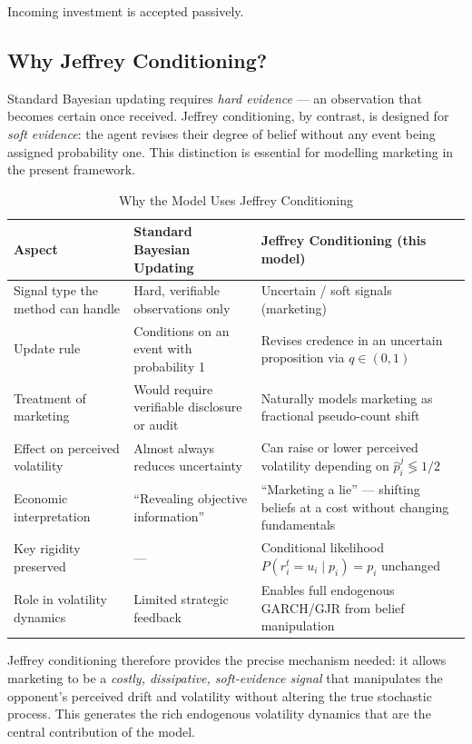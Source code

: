 \documentclass[12pt,a4paper]{article}
\newcommand{\1}{\mathbf{1}}
\begin{document}
Incoming investment is accepted passively.

\subsection{Why Jeffrey Conditioning?}

Standard Bayesian updating requires \emph{hard evidence} — an observation that becomes certain once received. Jeffrey conditioning, by contrast, is designed for \emph{soft evidence}: the agent revises their degree of belief without any event being assigned probability one. This distinction is essential for modelling marketing in the present framework.


\begin{table}[H]
\centering
\caption{Why the Model Uses Jeffrey Conditioning}
\label{tab:jeffrey_motivation}
\begin{tabular}{@{} l l l @{}}
\toprule
Aspect & Standard Bayesian Updating & Jeffrey Conditioning (this model) \\
\midrule
Signal type the method can handle & Hard, verifiable observations only & Uncertain / soft signals (marketing) \\
Update rule & Conditions on an event with probability 1 & Revises credence in an uncertain proposition via \(q \in (0,1)\) \\
Treatment of marketing & Would require verifiable disclosure or audit & Naturally models marketing as fractional pseudo-count shift \\
Effect on perceived volatility & Almost always reduces uncertainty & Can raise or lower perceived volatility depending on \(\hat{p}_i^j \lessgtr 1/2\) \\
Economic interpretation & ``Revealing objective information'' & ``Marketing a lie'' — shifting beliefs at a cost without changing fundamentals \\
Key rigidity preserved & — & Conditional likelihood \(P(r_i^t = u_i \mid p_i) = p_i\) unchanged \\
Role in volatility dynamics & Limited strategic feedback & Enables full endogenous GARCH/GJR from belief manipulation \\
\bottomrule
\end{tabular}
\end{table}


Jeffrey conditioning therefore provides the precise mechanism needed: it allows marketing to be a \emph{costly, dissipative, soft-evidence signal} that manipulates the opponent's perceived drift and volatility without altering the true stochastic process. This generates the rich endogenous volatility dynamics that are the central contribution of the model.
\end{document}
